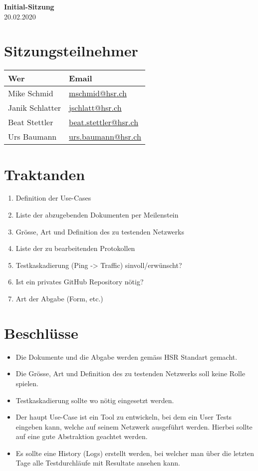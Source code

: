 \documentclass[
	ngerman,
	toc=listof, %
	toc=bibliography, %
	footnotes=multiple, %
	parskip=half, %
	numbers=noendperiod %
]{scrartcl}
\newcommand{\titel}{Initial-Sitzung}
\newcommand{\datum}{20.02.2020}
\begin{document}
\begin{center}
    \LARGE \textbf{\titel} \\[2ex]
    \large \datum \\[2ex]
\end{center}

\section*{Sitzungsteilnehmer}
\begin{tabularx}{0.9\linewidth}{Xl}
	\toprule
	Wer & Email \\
	\midrule
	Mike Schmid & \scriptsize \url{mschmid@hsr.ch} \\
	Janik Schlatter & \scriptsize \url{jschlatt@hsr.ch} \\
	Beat Stettler & \scriptsize \url{beat.stettler@hsr.ch} \\
	Urs Baumann & \scriptsize \url{urs.baumann@hsr.ch} \\
	\bottomrule
\end{tabularx}

\section*{Traktanden}
\begin{enumerate}
    \item Definition der Use-Cases
    \item Liste der abzugebenden Dokumenten per Meilenstein
    \item Grösse, Art und Definition des zu testenden Netzwerks
    \item Liste der zu bearbeitenden Protokollen
    \item Testkaskadierung (Ping -> Traffic) sinvoll/erwünscht?
    \item Ist ein privates GitHub Repository nötig?
    \item Art der Abgabe (Form, etc.)
\end{enumerate}

\section*{Beschlüsse}
\begin{itemize}
	\item Die Dokumente und die Abgabe werden gemäss HSR Standart gemacht.
	\item Die Grösse, Art und Definition des zu testenden Netzwerks soll keine Rolle spielen. 
	\item Testkaskadierung sollte wo nötig eingesetzt werden.
	\item Der haupt Use-Case ist ein Tool zu entwickeln, bei dem ein User Tests eingeben kann, welche auf seinem Netzwerk ausgeführt werden. Hierbei sollte auf eine gute Abstraktion geachtet werden.
	\item Es sollte eine History (Logs) erstellt werden, bei welcher man über die letzten Tage alle Testdurchläufe mit Resultate ansehen kann.
\end{itemize}
\end{document}
